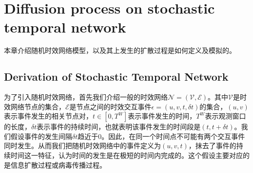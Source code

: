 \documentclass[journal]{IEEEtran}
\begin{document}
	
	
	
	
	\section{Diffusion process on stochastic temporal network}
	本章介绍随机时效网络模型，以及其上发生的扩散过程是如何定义及模拟的。
		\subsection{Derivation of Stochastic Temporal Network}
		为了引入随机时效网络，首先我们介绍一般的时效网络$\mathcal{N=(V,E)}$。其中$\mathcal{V}$是时效网络节点的集合，$\mathcal{E}$是节点之间的时效交互事件$\epsilon=(u,v,t,\delta t)$的集合，$(u,v)$表示事件发生的相关节点对，$t\in \left[ 0,T^W \right]$表示事件发生的时间，$T^W$表示观测窗口的长度，$\delta t$表示事件的持续时间，也就表明该事件发生的时间段是$(t,t+\delta t)$。我们假设事件的发生间隔$\delta t$趋近于0。因此，在同一个时间点不可能有两个交互事件同时发生。从而我们把随机时效网络中的事件定义为$(u,v,t)$，抹去了事件的持续时间这一特征，认为时间的发生是在极短的时间内完成的。这个假设主要对应的是信息扩散过程或病毒传播过程。
		
\end{document}
